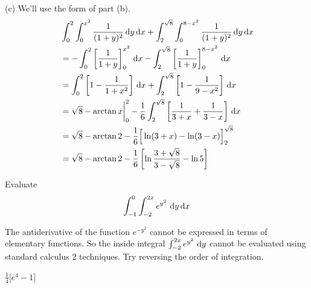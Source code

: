 \begin{solution}
(c) We'll use the form of part (b).
\begin{align*}
&\int_0^2\int_0^{x^2} \frac{1}{(1+y)^2}\,\mathrm{d}y\,\mathrm{d}x
+\int_2^{\sqrt{8}}\int_0^{8-x^2} \frac{1}{(1+y)^2}\,\mathrm{d}y\,\mathrm{d}x \\
&=-\int_0^2 \left[\frac{1}{1+y}\right]_0^{x^2}\,\mathrm{d}x
-\int_2^{\sqrt{8}} \left[\frac{1}{1+y}\right]_0^{8-x^2}\,\mathrm{d}x \\
&=\int_0^2 \left[1-\frac{1}{1+x^2}\right]\,\mathrm{d}x
+\int_2^{\sqrt{8}} \left[1-\frac{1}{9-x^2}\right]\,\mathrm{d}x \\
&=\sqrt{8}-\arctan x\bigg|_0^2
  -\frac{1}{6}\int_2^{\sqrt{8}} 
         \left[\frac{1}{3+x}+\frac{1}{3-x}\right]\,\mathrm{d}x \\
&=\sqrt{8}-\arctan 2 -\frac{1}{6}\Big[\ln(3+x)-\ln(3-x)\Big]_2^{\sqrt{8}} \\
&=\sqrt{8}-\arctan 2 -\frac{1}{6}\left[\ln\frac{3+\sqrt{8}}{3-\sqrt{8}}
                                       -\ln 5\right] 
\end{align*}
\end{solution}

\begin{question}[M200 2013D] %
Evaluate
\begin{equation*}
\int_{-1}^0 \int_{-2}^{2x} e^{y^2}\ \mathrm{d}y\,\mathrm{d}x
\end{equation*}
\end{question}

\begin{hint}
The antiderivative of the function $e^{-y^2}$ cannot be expressed
in terms of elementary functions. So the inside integral 
$\int_{-2}^{2x} e^{y^2}\ \dee{y}$ cannot be evaluated using 
standard calculus 2 techniques. Try reversing the order of integration.
\end{hint}

\begin{answer}
$\frac{1}{4}\big[e^4-1\big]$
\end{answer}

